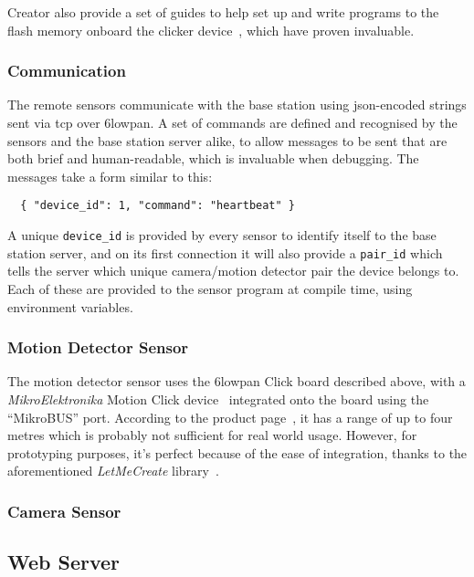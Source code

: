 Creator also provide a set of guides to help set up and write programs to the
flash memory onboard the clicker device~\cite{clickersetupguide}, which have
proven invaluable.

\subsubsection{Communication}
The remote sensors communicate with the base station using
\acrshort{json}-encoded strings sent via \acrshort{tcp} over \gls{6lowpan}. A
set of commands are defined and recognised by the sensors and the base
station server alike, to allow messages to be sent that are both brief and
human-readable, which is invaluable when debugging. The messages take a form similar to this:

\begin{verbatim}
  { "device_id": 1, "command": "heartbeat" }
\end{verbatim}

A unique \texttt{device\_id} is provided by every sensor to identify itself
to the base station server, and on its first connection it will also provide
a \texttt{pair\_id} which tells the server which unique camera/motion
detector pair the device belongs to. Each of these are provided to the sensor
program at compile time, using environment variables.~

\subsubsection{Motion Detector Sensor}
The motion detector sensor uses the \gls{6lowpan} Click board described
above, with a \textit{MikroElektronika} Motion Click
device~\cite{motionclick} integrated onto the board using the ``MikroBUS''
port. According to the product page~\cite{motionclick}, it has a range of up
to four metres which is probably not sufficient for real world usage.
However, for prototyping purposes, it's perfect because of the ease of
integration, thanks to the aforementioned
\textit{LetMeCreate} library~\cite{letmecreate}.

\subsubsection{Camera Sensor}

\subsection{Web Server}